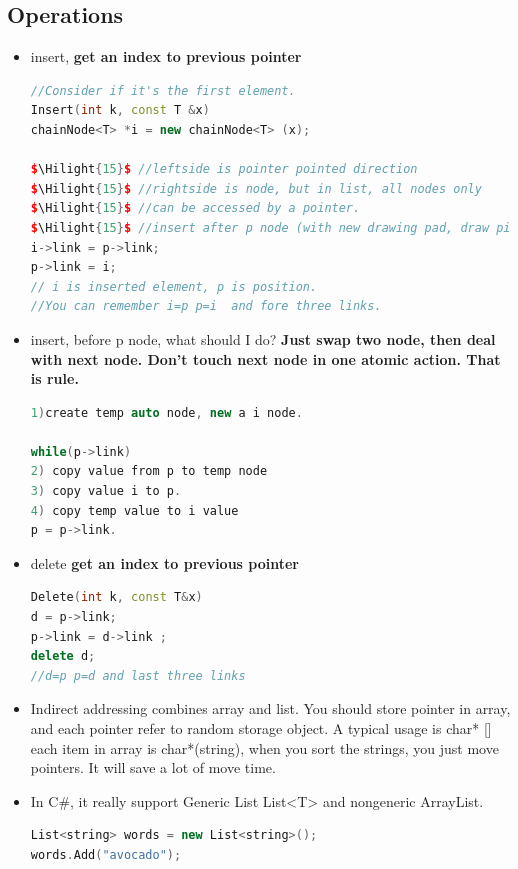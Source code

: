 \documentclass[a4paper,12pt,twoside]{book}
\newcommand{\Hilight}[1]{\makebox[0pt][l]{\color{yellow}\rule[-3pt]{#1em}{11pt}}}
\begin{document}
\subsection{Operations}
\begin{itemize}
\item insert, \textbf{get an index to previous pointer}
\begin{lstlisting}[frame=single, language=c++, mathescape=true]
//Consider if it's the first element. 
Insert(int k, const T &x)
chainNode<T> *i = new chainNode<T> (x);

$\Hilight{15}$ //leftside is pointer pointed direction
$\Hilight{15}$ //rightside is node, but in list, all nodes only 
$\Hilight{15}$ //can be accessed by a pointer.
$\Hilight{15}$ //insert after p node (with new drawing pad, draw picture here.)
i->link = p->link;
p->link = i;
// i is inserted element, p is position.  
//You can remember i=p p=i  and fore three links.
\end{lstlisting}

\item insert, before p node, what should I do?  \textbf{Just swap two node, then deal with next node. Don't touch next node in one atomic action. That is rule. }
\begin{lstlisting}[frame=single, language=c++, mathescape=true]
1)create temp auto node, new a i node.
 
while(p->link) 
2) copy value from p to temp node
3) copy value i to p.
4) copy temp value to i value
p = p->link.  
\end{lstlisting}

\item delete \textbf{get an index to previous pointer}
\begin{lstlisting}[frame=single, language=c++]
Delete(int k, const T&x)
d = p->link;
p->link = d->link ;
delete d;
//d=p p=d and last three links
\end{lstlisting}

\item Indirect addressing combines array and list. You should store pointer in array, and each pointer refer to random storage object. A typical usage is char* [] each item in array is char*(string), when you sort the strings, you just move pointers. It will save a lot of move time.  
\item In C\#, it really support Generic List List<T> and nongeneric ArrayList. 
\begin{lstlisting}[frame=single, language=c++]
List<string> words = new List<string>();
words.Add("avocado");
\end{lstlisting}

\end{itemize} 
\end{document}

